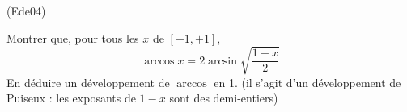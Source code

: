 \begin{tiny}(Ede04)\end{tiny}
Montrer que, pour tous les $x $ de $[ -1,+1] $,
\begin{displaymath}
\arccos x=2\arcsin \sqrt{\frac{1-x}{2}} 
\end{displaymath}
En d{\'e}duire un d{\'e}veloppement de $\arccos$ en 1. (il s'agit d'un développement de Puiseux : les exposants de $1-x$  sont des demi-entiers)
